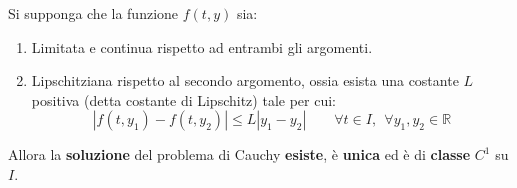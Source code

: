 \highspace
\begin{definitionbox}
	Si supponga che la funzione $f\left(t,y\right)$ sia:
	\begin{enumerate}
		\item Limitata e continua rispetto ad entrambi gli argomenti.
		
		\item Lipschitziana rispetto al secondo argomento, ossia esista una costante $L$ positiva (detta costante di Lipschitz) tale per cui:
		\begin{equation}
			\left|f\left(t, y_{1}\right) - f\left(t, y_{2}\right)\right| \le L\left|y_{1} - y_{2}\right| \hspace{2em} \forall t \in I, \:\: \forall y_{1}, y_{2} \in \mathbb{R}
		\end{equation}
	\end{enumerate}
	Allora la \textbf{soluzione} del problema di Cauchy \textbf{esiste}, è \textbf{unica} ed è di \textbf{classe} $C^{1}$ su $I$.
\end{definitionbox}